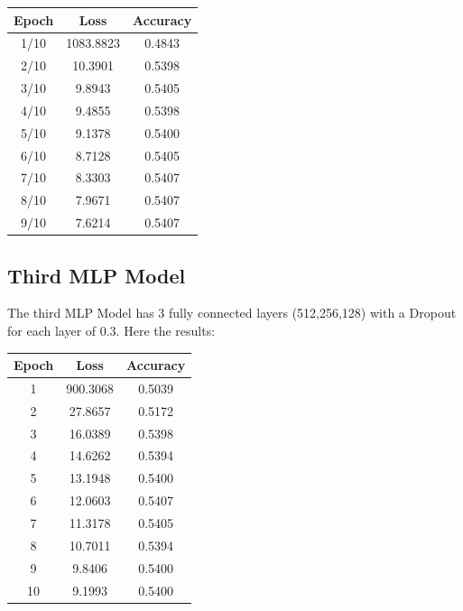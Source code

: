 \begin{center}
\begin{tabular}{|c|c|c|}
\hline
\textbf{Epoch} & \textbf{Loss} & \textbf{Accuracy} \\
\hline
1/10 & 1083.8823 & 0.4843 \\
\hline
2/10 & 10.3901 & 0.5398 \\
\hline
3/10 & 9.8943 & 0.5405 \\
\hline
4/10 & 9.4855 & 0.5398 \\
\hline
5/10 & 9.1378 & 0.5400 \\
\hline
6/10 & 8.7128 & 0.5405 \\
\hline
7/10 & 8.3303 & 0.5407 \\
\hline
8/10 & 7.9671 & 0.5407 \\
\hline
9/10 & 7.6214 & 0.5407 \\
\hline
\end{tabular}
\end{center}
\subsection{Third MLP Model}
The third MLP Model has 3 fully connected layers (512,256,128) with a Dropout for each layer of 0.3. Here the results:
\begin{center}
\begin{tabular}{|c|c|c|}
\hline
Epoch & Loss & Accuracy \\
\hline
1 & 900.3068 & 0.5039 \\
\hline
2 & 27.8657 & 0.5172 \\
\hline
3 & 16.0389 & 0.5398 \\
\hline
4 & 14.6262 & 0.5394 \\
\hline
5 & 13.1948 & 0.5400 \\
\hline
6 & 12.0603 & 0.5407 \\
\hline
7 & 11.3178 & 0.5405 \\
\hline
8 & 10.7011 & 0.5394 \\
\hline
9 & 9.8406 & 0.5400 \\
\hline
10 & 9.1993 & 0.5400 \\
\hline
\end{tabular}
\end{center}

